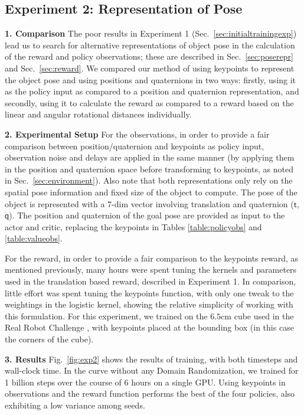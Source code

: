 \documentclass[letterpaper, 10 pt, conference]{ieeeconf}  %
\newcommand{\secref}[1]{Sec.~\ref{#1}}
\newcommand{\figref}[1]{Fig.~\ref{#1}}
\begin{document}
\vspace{-3pt}
\subsection{Experiment 2: Representation of Pose}
\label{sec:posereprexp}

\noindent \textbf{1. Comparison} The poor results in Experiment 1 (\secref{sec:initialtrainingexp}) lead us to search for alternative representations of object pose in the calculation of the reward and policy observations; these are described in \secref{sec:poserepr} and \secref{sec:reward}.
We compared our method of using keypoints to represent the object pose and using positions and quaternions in two ways: firstly, using it as the policy input as compared to a position and quaternion representation, and secondly, using it to calculate the reward as compared to a reward based on the linear and angular rotational distances individually.

\noindent \textbf{2. Experimental Setup} For the observations, in order to provide a fair comparison between position/quaternion and keypoints as policy input, observation noise and delays are applied in the same manner (by applying them in the position and quaternion space before transforming to keypoints, as noted in \secref{sec:environment}). Also note that both representations only rely on the spatial pose information and fixed size of the object to compute. The pose of the object is represented with a 7-dim vector involving translation and quaternion ($\mathsf{t}$,  $\mathsf{q}$). The position and quaternion of the goal pose are provided as input to the actor and critic, replacing the keypoints in Tables \ref{table:policyobs} and \ref{table:valueobs}.

For the reward, in order to provide a fair comparison to the keypoints reward, as mentioned previously, many hours were spent tuning the kernels and parameters used in the translation based reward, described in Experiment 1. In comparison, little effort was spent tuning the keypoints function, with only one tweak to the weightings in the logistic kernel, showing the relative simplicity of working with this formulation. For this experiment, we trained on the $6.5 \text{cm}$ cube used in the Real Robot Challenge \citep{real-robot-challenge}, with keypoints placed at the bounding box (in this case the corners of the cube).

\noindent \textbf{3. Results} \figref{fig:exp2} shows the results of training, with both timesteps and wall-clock time. In the curve without any Domain Randomization, we trained for 1 billion steps over the course of 6 hours on a single GPU. Using keypoints in observations and the reward function performs the best of the four policies, also exhibiting a low variance among seeds.
\end{document}
